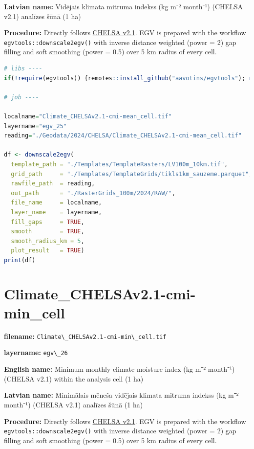 \documentclass[
]{book}
\newcommand{\passthrough}[1]{#1}
\begin{document}
\textbf{Latvian name:} Vidējais klimata mitruma indekss (kg m⁻² month⁻¹) (CHELSA v2.1) analīzes šūnā (1 ha)

\textbf{Procedure:} Directly follows \hyperref[Ch04.11]{CHELSA v2.1}. EGV is prepared with the
workflow \passthrough{\lstinline!egvtools::downscale2egv()!} with inverse distance weighted (power = 2)
gap filling and soft smoothing (power = 0.5) over 5 km radius of every cell.

\begin{lstlisting}[language=R]
# libs ----
if(!require(egvtools)) {remotes::install_github("aavotins/egvtools"); require(egvtools)}

# job ----

localname="Climate_CHELSAv2.1-cmi-mean_cell.tif"
layername="egv_25"
reading="./Geodata/2024/CHELSA/Climate_CHELSAv2.1-cmi-mean_cell.tif"

df <- downscale2egv(
  template_path = "./Templates/TemplateRasters/LV100m_10km.tif",
  grid_path     = "./Templates/TemplateGrids/tikls1km_sauzeme.parquet",
  rawfile_path  = reading,
  out_path      = "./RasterGrids_100m/2024/RAW/",
  file_name     = localname,
  layer_name    = layername,
  fill_gaps     = TRUE,
  smooth        = TRUE,
  smooth_radius_km = 5,
  plot_result   = TRUE)
print(df)
\end{lstlisting}

\section{Climate\_CHELSAv2.1-cmi-min\_cell}\label{ch06.026}

\textbf{filename:} \passthrough{\lstinline!Climate\_CHELSAv2.1-cmi-min\_cell.tif!}

\textbf{layername:} \passthrough{\lstinline!egv\_26!}

\textbf{English name:} Minimum monthly climate moisture index (kg m⁻² month⁻¹) (CHELSA v2.1) within the analysis cell (1 ha)

\textbf{Latvian name:} Minimālais mēneša vidējais klimata mitruma indekss (kg m⁻² month⁻¹) (CHELSA v2.1) analīzes šūnā (1 ha)

\textbf{Procedure:} Directly follows \hyperref[Ch04.11]{CHELSA v2.1}. EGV is prepared with the
workflow \passthrough{\lstinline!egvtools::downscale2egv()!} with inverse distance weighted (power = 2)
gap filling and soft smoothing (power = 0.5) over 5 km radius of every cell.
\end{document}
